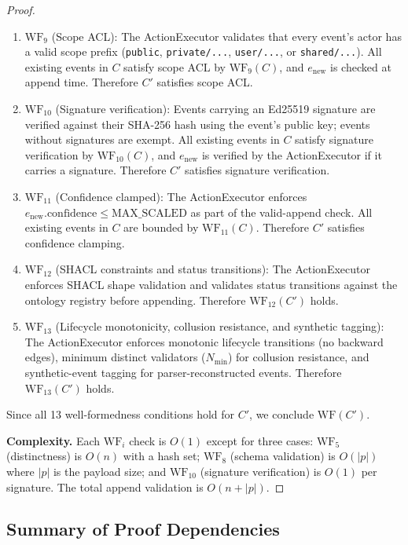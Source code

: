 \begin{proof}
\begin{enumerate}[label=Step~\arabic*:,leftmargin=2em]
    \item $\text{WF}_9$ (Scope ACL): The ActionExecutor validates that every event's actor has a valid scope prefix (\texttt{public}, \texttt{private/...}, \texttt{user/...}, or \texttt{shared/...}). All existing events in $C$ satisfy scope ACL by $\text{WF}_9(C)$, and $e_{\text{new}}$ is checked at append time. Therefore $C'$ satisfies scope ACL.
    \item $\text{WF}_{10}$ (Signature verification): Events carrying an Ed25519 signature are verified against their SHA-256 hash using the event's public key; events without signatures are exempt. All existing events in $C$ satisfy signature verification by $\text{WF}_{10}(C)$, and $e_{\text{new}}$ is verified by the ActionExecutor if it carries a signature. Therefore $C'$ satisfies signature verification.
    \item $\text{WF}_{11}$ (Confidence clamped): The ActionExecutor enforces $e_{\text{new}}.\text{confidence} \leq \text{MAX\_SCALED}$ as part of the valid-append check. All existing events in $C$ are bounded by $\text{WF}_{11}(C)$. Therefore $C'$ satisfies confidence clamping.
    \item $\text{WF}_{12}$ (SHACL constraints and status transitions): The ActionExecutor enforces SHACL shape validation and validates status transitions against the ontology registry before appending. Therefore $\text{WF}_{12}(C')$ holds.
    \item $\text{WF}_{13}$ (Lifecycle monotonicity, collusion resistance, and synthetic tagging): The ActionExecutor enforces monotonic lifecycle transitions (no backward edges), minimum distinct validators ($N_{\min}$) for collusion resistance, and synthetic-event tagging for parser-reconstructed events. Therefore $\text{WF}_{13}(C')$ holds.
\end{enumerate}

Since all 13 well-formedness conditions hold for $C'$, we conclude $\text{WF}(C')$.

\textbf{Complexity.} Each $\text{WF}_i$ check is $O(1)$ except for three cases: $\text{WF}_5$ (distinctness) is $O(n)$ with a hash set; $\text{WF}_8$ (schema validation) is $O(|p|)$ where $|p|$ is the payload size; and $\text{WF}_{10}$ (signature verification) is $O(1)$ per signature. The total append validation is $O(n + |p|)$.
\end{proof}

\subsection{Summary of Proof Dependencies}

